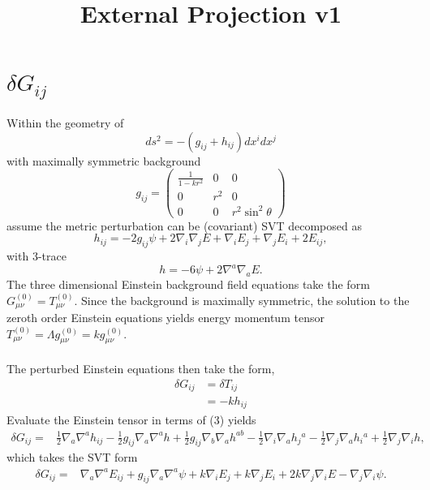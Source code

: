 \documentclass[10pt,letterpaper]{article}
\title{External Projection v1}
\date{}
\begin{document}
 
\maketitle
\noindent 
\section*{$\delta G_{ij}$}
Within the geometry of 
\begin{equation}
ds^2 = -(g_{ij} + h_{ij})dx^i dx^j 
\end{equation}
with maximally symmetric background
\begin{equation}
g_{ij} = \begin{pmatrix} \frac{1}{1-kr^2} &0&0\\ 0&r^2&0\\0&0&r^2\sin^2\theta\end{pmatrix}
\end{equation}
assume the metric perturbation can be (covariant) SVT decomposed as
\begin{equation}
h_{ij} = -2 g_{ij}\psi + 2\nabla_i\nabla_j E + \nabla_i E_j + \nabla_j E_i + 2E_{ij},
\end{equation}
with 3-trace
\begin{equation}
h = -6 \psi + 2\nabla^a\nabla_a E.
\end{equation}
The three dimensional Einstein background field equations take the form $G_{\mu\nu}^{(0)} = T_{\mu\nu}^{(0)}$. Since the background is maximally symmetric, the solution to the zeroth order Einstein equations yields energy momentum tensor $T_{\mu\nu}^{(0)} = \Lambda g_{\mu\nu}^{(0)} = k g_{\mu\nu}^{(0)}$.
\\ \\
The perturbed Einstein equations then take the form,
\begin{align}
\delta G_{ij} &= \delta T_{ij}\\
&= -k h_{ij} 
\end{align}
Evaluate the Einstein tensor in terms of (3) yields
\begin{align}
\delta G_{ij}={}&\tfrac{1}{2} \nabla_{a}\nabla^{a}h_{ij}
 -  \tfrac{1}{2} g_{ij} \nabla_{a}\nabla^{a}h
 + \tfrac{1}{2} g_{ij} \nabla_{b}\nabla_{a}h^{ab}
 -  \tfrac{1}{2} \nabla_{i}\nabla_{a}h_{j}{}^{a}
 -  \tfrac{1}{2} \nabla_{j}\nabla_{a}h_{i}{}^{a}
 + \tfrac{1}{2} \nabla_{j}\nabla_{i}h,
\end{align}
which takes the SVT form
\begin{align}
\delta G_{ij}={}&\nabla_{a}\nabla^{a}E_{ij}
 + g_{ij} \nabla_{a}\nabla^{a}\psi
 + k \nabla_{i}E_{j}
 + k \nabla_{j}E_{i}
 + 2 k \nabla_{j}\nabla_{i}E
 -  \nabla_{j}\nabla_{i}\psi.
\end{align}
\end{document}
